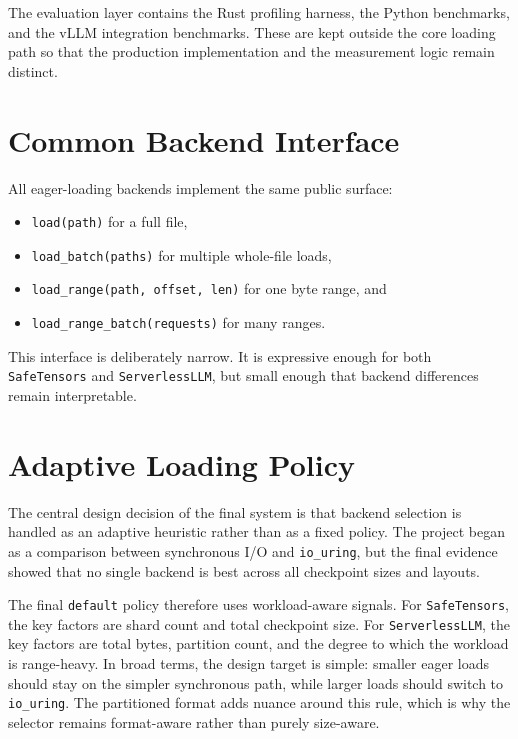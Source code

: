 The evaluation layer contains the Rust profiling harness, the Python benchmarks, and the vLLM integration benchmarks. These are kept outside the core loading path so that the production implementation and the measurement logic remain distinct.

\section{Common Backend Interface}

All eager-loading backends implement the same public surface:

\begin{itemize}
\item \texttt{load(path)} for a full file,
\item \texttt{load\_batch(paths)} for multiple whole-file loads,
\item \texttt{load\_range(path, offset, len)} for one byte range, and
\item \texttt{load\_range\_batch(requests)} for many ranges.
\end{itemize}

This interface is deliberately narrow. It is expressive enough for both \texttt{SafeTensors} and \texttt{ServerlessLLM}, but small enough that backend differences remain interpretable.

\section{Adaptive Loading Policy}

The central design decision of the final system is that backend selection is handled as an adaptive heuristic rather than as a fixed policy. The project began as a comparison between synchronous I/O and \texttt{io\_uring}, but the final evidence showed that no single backend is best across all checkpoint sizes and layouts.

The final \texttt{default} policy therefore uses workload-aware signals. For \texttt{SafeTensors}, the key factors are shard count and total checkpoint size. For \texttt{ServerlessLLM}, the key factors are total bytes, partition count, and the degree to which the workload is range-heavy. In broad terms, the design target is simple: smaller eager loads should stay on the simpler synchronous path, while larger loads should switch to \texttt{io\_uring}. The partitioned format adds nuance around this rule, which is why the selector remains format-aware rather than purely size-aware.

